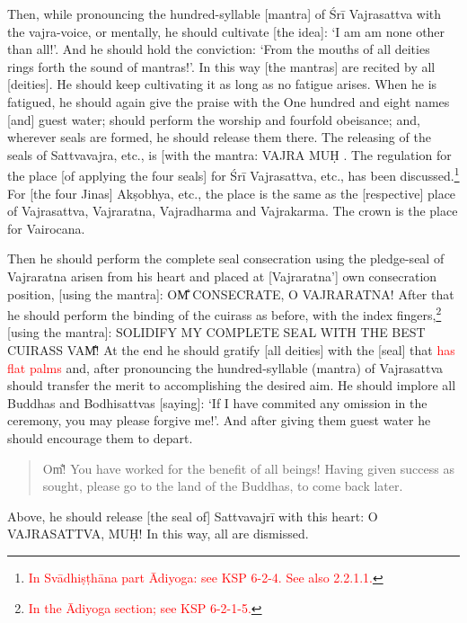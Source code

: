 \documentclass[11pt]{book}
\makeatletter
\def\fakesc#1{%
  \begingroup%
  \xdef\fake@name{\csname\curr@fontshape/\f@size\endcsname}%
  \fontsize{1.3\fontdimen8\fake@name}{\baselineskip}\selectfont%
  \uppercase{#1}%
  \endgroup%
}
\newcommand{\mantra}[1]{\fakesc{#1}}
\newcommand{\red}[1]{\textcolor{red}{#1}}
\makeatother
\begin{document}
Then, while pronouncing the hundred-syllable [mantra] of Śrī Vajrasattva with the vajra-voice, or mentally, he should cultivate [the idea]: `I am am none other than all!'. And he should hold the conviction: `From the mouths of all deities rings forth the sound of mantras!'. In this way [the mantras] are recited by all [deities]. He should keep cultivating it as long as no fatigue arises. When he is fatigued, he should again give the praise with the One hundred and eight names [and] guest water; should perform the worship and fourfold obeisance; and, wherever seals are formed, he should release them there. The releasing of the seals of Sattvavajra, etc., is [with the mantra: \mantra{vajra muḥ}. The regulation for the place [of applying the four seals] for Śrī Vajrasattva, etc., has been discussed.\footnote{\red{In Svādhiṣṭhāna part Ādiyoga: see KSP 6-2-4. See also 2.2.1.1.}} For [the four Jinas] Akṣobhya, etc., the place is the same as the [respective] place of Vajrasattva, Vajraratna, Vajradharma and Vajrakarma. The crown is the place for Vairocana.

Then he should perform the complete seal consecration using the pledge-seal of Vajraratna arisen from his heart and placed at [Vajraratna'] own consecration position, [using the mantra]: \mantra{om̐ consecrate, o vajraratna!} After that he should perform the binding of the cuirass as before, with the index fingers,\footnote{\red{In the Ādiyoga section; see KSP 6-2-1-5.}} [using the mantra]: \mantra{solidify my complete seal with the best cuirass vam̐!} At the end he should gratify [all deities] with the [seal] that \red{has flat palms} and, after pronouncing the hundred-syllable (mantra) of Vajrasattva should transfer the merit to  accomplishing the desired aim. He should implore all Buddhas and Bodhisattvas [saying]: `If I have commited any omission in the ceremony, you may please forgive me!'. And after giving them guest water he should encourage them to depart.

\begin{verse}
Om̐! You have worked for the benefit of all beings! Having given success as sought, please go to the land of the Buddhas, to come back later.
\end{verse}

Above, he should release [the seal of] Sattvavajrī with this heart: \mantra{o Vajrasattva, muḥ!} In this way, all are dismissed.
\end{document}
